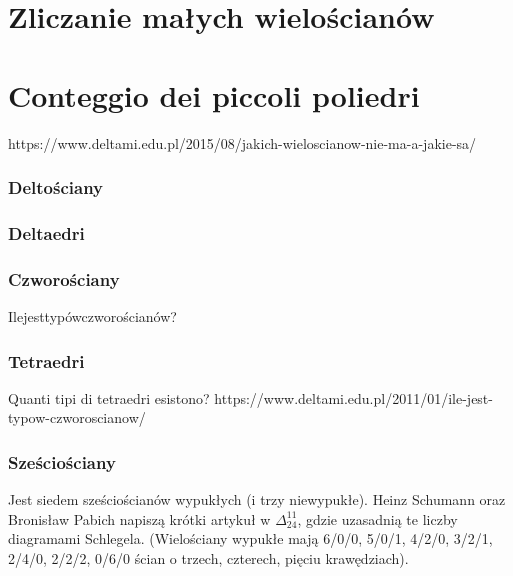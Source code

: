 
%

\section{Zliczanie małych wielościanów} %
\section{Conteggio dei piccoli poliedri} %

https://www.deltami.edu.pl/2015/08/jakich-wieloscianow-nie-ma-a-jakie-sa/

\subsubsection{Deltościany} %
\subsubsection{Deltaedri} %

\subsubsection{Czworościany} %
Ilejesttypówczworościanów? %
\subsubsection{Tetraedri} %
Quanti tipi di tetraedri esistono? %
https://www.deltami.edu.pl/2011/01/ile-jest-typow-czworoscianow/

\subsubsection{Sześciościany} %
Jest siedem sześciościanów wypukłych (i trzy niewypukłe). %
Heinz Schumann oraz Bronisław Pabich napiszą krótki artykuł w $\Delta_{24}^{11}$, gdzie uzasadnią te liczby diagramami Schlegela. %
(Wielościany wypukłe mają 6/0/0, 5/0/1, 4/2/0, 3/2/1, 2/4/0, 2/2/2, 0/6/0 ścian o trzech, czterech, pięciu krawędziach). %

